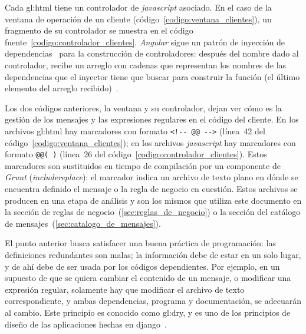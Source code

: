 
Cada \gls{gl:html} tiene un controlador de \textit{javascript} asociado. En el
caso de la ventana de operación de un cliente
(código~\ref{codigo:ventana_clientes}), un fragmento de su controlador se
muestra en el código fuente~\ref{codigo:controlador_clientes}. \textit{Angular}
sigue un patrón de inyección de dependencias~\cite{inyeccion_de_dependencias}
para la construcción de controladores: después del nombre dado al controlador,
recibe un arreglo con cadenas que representan los nombres de las dependencias
que el inyector tiene que buscar para construir la función (el último elemento
del arreglo recibido)~\cite{angular_inyector}.



Los dos códigos anteriores, la ventana y su controlador, dejan ver cómo es la
gestión de los mensajes y las expresiones regulares en el código del cliente.
En los archivos \gls{gl:html} hay marcadores con formato \verb|<!-- @@ -->|
(línea~42 del código~\ref{codigo:ventana_clientes}); en los archivos
\textit{javascript} hay marcadores con formato \verb|@@( )| (línea~26 del
código~\ref{codigo:controlador_clientes}). Estos marcadores son sustituidos en
tiempo de compilación por un componente de \textit{Grunt}
(\textit{includereplace}): el marcador indica un archivo de texto plano en
dónde se encuentra definido el mensaje o la regla de negocio en cuestión. Estos
archivos se producen en una etapa de análisis y son los mismos que utiliza este
documento en la sección de reglas de negocio~(\ref{sec:reglas_de_negocio}) o la
sección del catálogo de mensajes~(\ref{sec:catalogo_de_mensajes}).

El punto anterior busca satisfacer una buena práctica de programación: las
definiciones redundantes son malas; la información debe de estar en un solo
lugar, y de ahí debe de ser usada por los códigos dependientes. Por ejemplo,
en un supuesto de que se quiera cambiar el contenido de un mensaje, o modificar
una expresión regular, solamente hay que modificar el archivo de texto
correspondiente, y ambas dependencias, programa y documentación, se adecuarán
al cambio. Este principio es conocido como \gls{gl:dry}, y es uno de los
principios de diseño de las aplicaciones hechas en
django~\cite{django_principios_de_disenio}.

